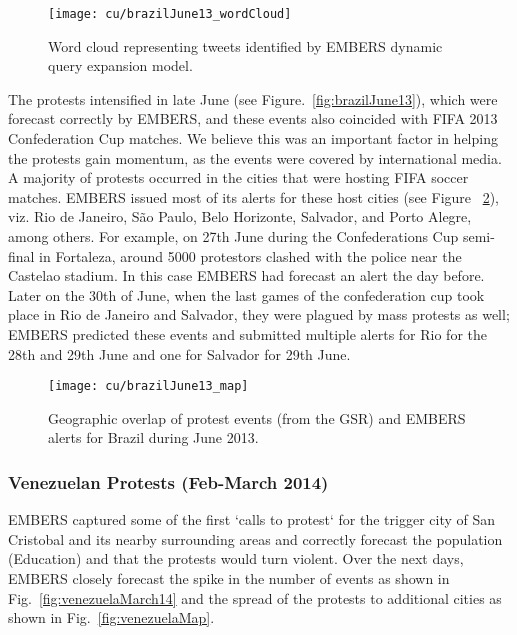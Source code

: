 \begin{figure}[H]
\centering
\texttt{[image: cu/brazilJune13\_wordCloud]}
\caption{Word cloud representing tweets identified by EMBERS dynamic query expansion model.}
\label{fig:brazilJune13_wordCloud}
\end{figure}

The protests intensified in late June (see Figure.~\ref{fig:brazilJune13}), which were
forecast correctly by EMBERS, and these events
also coincided with FIFA 2013 Confederation Cup matches. We believe this was an important factor in helping
the protests gain momentum,
as the events were covered by international media. A majority of protests
occurred in the cities that were hosting FIFA soccer matches.
EMBERS issued most of its alerts for these host cities (see Figure
~\ref{fig:brazilJune13_map}), viz.
Rio de Janeiro, São Paulo,
Belo Horizonte, Salvador, and Porto Alegre,
among others. For example, on 27th June during the Confederations Cup
semi-final in Fortaleza, around 5000 protestors clashed with the police
near the Castelao stadium. In this case EMBERS had forecast an alert the
day before. Later on the 30th of June, when the last games of the
confederation cup took place in Rio de Janeiro and Salvador, they
were plagued by mass protests as well; EMBERS predicted these events and
submitted multiple alerts for Rio for the 28th and 29th June and one for
Salvador for 29th June.

\begin{figure}[H]
\centering
\texttt{[image: cu/brazilJune13\_map]}
\caption{Geographic overlap of protest events (from the GSR) and EMBERS
alerts for Brazil during June 2013.}
\label{fig:brazilJune13_map}
\end{figure}

\subsubsection*{Venezuelan Protests (Feb-March 2014)}

EMBERS captured some of the first `calls to protest` for the trigger city of
San Cristobal and its nearby surrounding areas and correctly forecast the
population (Education) and that the protests would turn violent. Over the next
days, EMBERS closely forecast the spike in the number of events as shown
in Fig.~\ref{fig:venezuelaMarch14} and the spread
of the protests to additional cities as shown in
Fig.~\ref{fig:venezuelaMap}.

